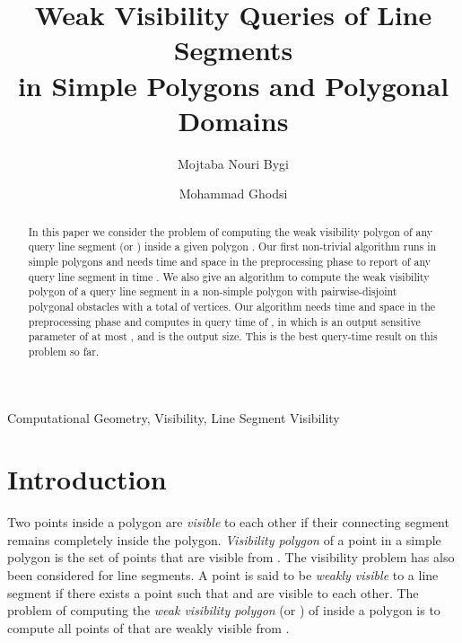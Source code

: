 \documentclass[5p]{elsarticle}
\begin{document}
\title{Weak Visibility Queries of Line Segments \\ in Simple Polygons and Polygonal Domains}


\author[add1]{Mojtaba Nouri Bygi}
\author[add1,add2]{Mohammad Ghodsi}

\address[add1]{Computer Engineering Department, Sharif University of Technology, Iran}
\address[add2]{School of Computer Science, Institute for Research in Fundamental Sciences (IPM), Iran}

  \begin{abstract}
In this paper we consider the problem of computing 
the weak visibility polygon of any query line segment  (or ) inside a given 
polygon . Our first non-trivial algorithm runs in simple polygons
and needs  time and  space in the preprocessing phase to 
report  of any query line segment  in time .
We also give an algorithm to compute the weak visibility
polygon of a query line segment in a non-simple polygon with  pairwise-disjoint polygonal obstacles 
with a total of  vertices. Our algorithm needs  time and  
space in the preprocessing phase and computes  in query time of , in which
 is an output sensitive parameter of at most ,
and  is the output size. This is the best query-time result 
on this problem so far.
\end{abstract}
\begin{keyword}
Computational Geometry, Visibility, Line Segment Visibility
\end{keyword}

\maketitle

  
  
\section{Introduction \label{sec:intro}}

Two points inside a polygon are {\em visible} to each other if their connecting segment remains
completely inside the polygon. {\em Visibility polygon}  of a point
 in a simple polygon  is the set of  points that are visible from . 
The visibility problem has also been considered for line segments.
A point  is said to be {\em weakly visible} to a line segment  if there exists
a point  such that  and  are visible to each other.
The problem of computing the {\em weak visibility polygon} (or ) of  inside a polygon  is 
to compute all points of  that are weakly visible from .
\end{document}
